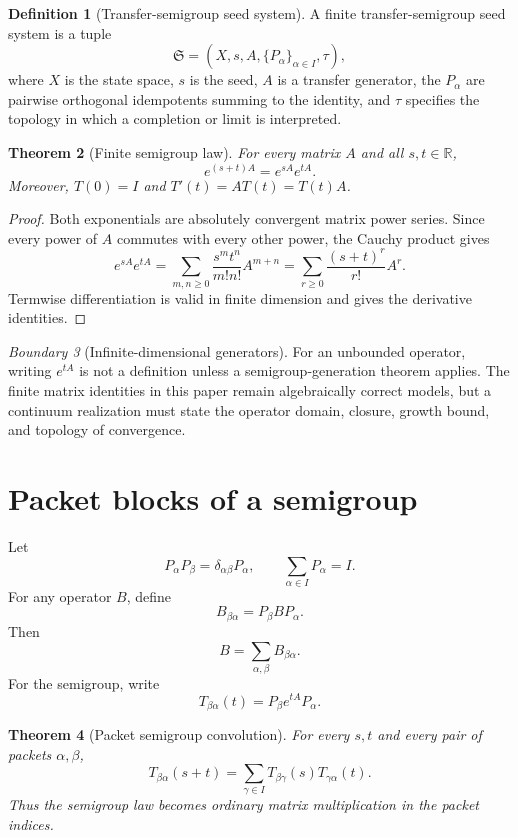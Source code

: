 \documentclass[11pt]{article}
\newtheorem{theorem}{Theorem}[section]
\theoremstyle{definition}
\newtheorem{definition}[theorem]{Definition}
\theoremstyle{remark}
\newtheorem{boundary}[theorem]{Boundary}
\newcommand{\bbR}{\mathbb R}
\begin{document}
\begin{definition}[Transfer-semigroup seed system]
A finite transfer-semigroup seed system is a tuple
\[
\mathfrak S=(X,s,A,\{P_\alpha\}_{\alpha\in I},\tau),
\]
where $X$ is the state space, $s$ is the seed, $A$ is a transfer generator, the $P_\alpha$ are pairwise orthogonal idempotents summing to the identity, and $\tau$ specifies the topology in which a completion or limit is interpreted.
\end{definition}

\begin{theorem}[Finite semigroup law]
For every matrix $A$ and all $s,t\in\bbR$,
\[
\boxed{e^{(s+t)A}=e^{sA}e^{tA}.}
\]
Moreover, $T(0)=I$ and $T'(t)=AT(t)=T(t)A$.
\end{theorem}

\begin{proof}
Both exponentials are absolutely convergent matrix power series. Since every power of $A$ commutes with every other power, the Cauchy product gives
\[
e^{sA}e^{tA}
=\sum_{m,n\ge0}\frac{s^mt^n}{m!n!}A^{m+n}
=\sum_{r\ge0}\frac{(s+t)^r}{r!}A^r.
\]
Termwise differentiation is valid in finite dimension and gives the derivative identities.
\end{proof}

\begin{boundary}[Infinite-dimensional generators]
For an unbounded operator, writing $e^{tA}$ is not a definition unless a semigroup-generation theorem applies. The finite matrix identities in this paper remain algebraically correct models, but a continuum realization must state the operator domain, closure, growth bound, and topology of convergence.
\end{boundary}

\section{Packet blocks of a semigroup}

Let
\[
P_\alpha P_\beta=\delta_{\alpha\beta}P_\alpha,
\qquad
\sum_{\alpha\in I}P_\alpha=I.
\]
For any operator $B$, define
\[
B_{\beta\alpha}=P_\beta BP_\alpha.
\]
Then
\[
B=\sum_{\alpha,\beta}B_{\beta\alpha}.
\]
For the semigroup, write
\[
T_{\beta\alpha}(t)=P_\beta e^{tA}P_\alpha.
\]

\begin{theorem}[Packet semigroup convolution]
For every $s,t$ and every pair of packets $\alpha,\beta$,
\[
\boxed{
T_{\beta\alpha}(s+t)
=\sum_{\gamma\in I}T_{\beta\gamma}(s)T_{\gamma\alpha}(t).
}
\]
Thus the semigroup law becomes ordinary matrix multiplication in the packet indices.
\end{theorem}
\end{document}

